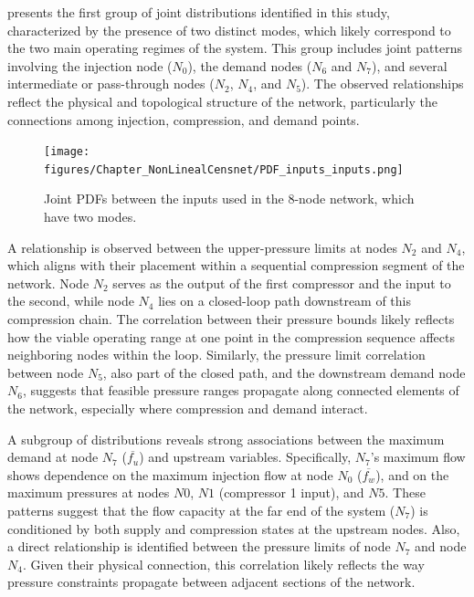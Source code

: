 presents the first group of joint distributions identified in this study, characterized by the presence of two distinct modes, which likely correspond to the two main operating regimes of the system. This group includes joint patterns involving the injection node ($N_0$), the demand nodes ($N_6$ and $N_7$), and several intermediate or pass-through nodes ($N_2$, $N_4$, and $N_5$). The observed relationships reflect the physical and topological structure of the network, particularly the connections among injection, compression, and demand points.

\begin{figure}[h]
    \begin{center}
        \texttt{[image: figures/Chapter\_NonLinealCensnet/PDF\_inputs\_inputs.png]}
    \end{center}
    \caption{Joint PDFs between the inputs used in the 8-node network, which have two modes. }\label{fig:joint_distributions_input_input}
\end{figure}
 
A relationship is observed between the upper-pressure limits at nodes \( N_2 \) and \( N_4 \), which aligns with their placement within a sequential compression segment of the network. Node \( N_2 \) serves as the output of the first compressor and the input to the second, while node \( N_4 \) lies on a closed-loop path downstream of this compression chain. The correlation between their pressure bounds likely reflects how the viable operating range at one point in the compression sequence affects neighboring nodes within the loop. Similarly, the pressure limit correlation between node \( N_5 \), also part of the closed path, and the downstream demand node \( N_6 \), suggests that feasible pressure ranges propagate along connected elements of the network, especially where compression and demand interact.


A subgroup of distributions reveals strong associations between the maximum demand at node $N_7$ ($\overline{f_u}$) and upstream variables. Specifically, $N_7$'s maximum flow shows dependence on the maximum injection flow at node $N_0$ ($\overline{f_w}$), and on the maximum pressures at nodes $N0$, $N1$ (compressor 1 input), and $N5$. These patterns suggest that the flow capacity at the far end of the system ($N_7$) is conditioned by both supply and compression states at the upstream nodes. Also, a direct relationship is identified between the pressure limits of node $N_7$ and node $N_4$. Given their physical connection, this correlation likely reflects the way pressure constraints propagate between adjacent sections of the network.

